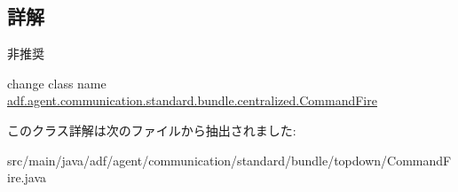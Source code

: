 \subsection{詳解}
\begin{DoxyRefDesc}{非推奨}
\item[\hyperlink{deprecated__deprecated000002}{非推奨}]change class name \hyperlink{classadf_1_1agent_1_1communication_1_1standard_1_1bundle_1_1centralized_1_1CommandFire}{adf.\+agent.\+communication.\+standard.\+bundle.\+centralized.\+Command\+Fire} \end{DoxyRefDesc}


このクラス詳解は次のファイルから抽出されました\+:\begin{DoxyCompactItemize}
\item 
src/main/java/adf/agent/communication/standard/bundle/topdown/Command\+Fire.\+java\end{DoxyCompactItemize}
